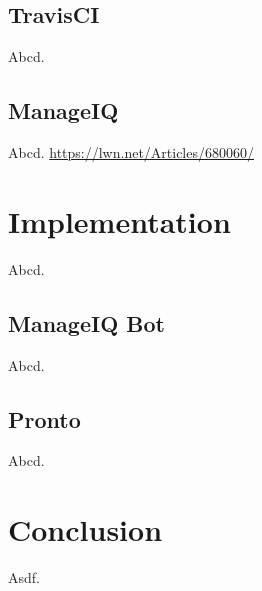 \section{TravisCI}

Abcd.

\section{ManageIQ}

Abcd. \url{https://lwn.net/Articles/680060/}

\chapter{Implementation}

Abcd.

\section{ManageIQ Bot}

Abcd.

\section{Pronto}

Abcd.

\chapter{Conclusion}

Asdf.
